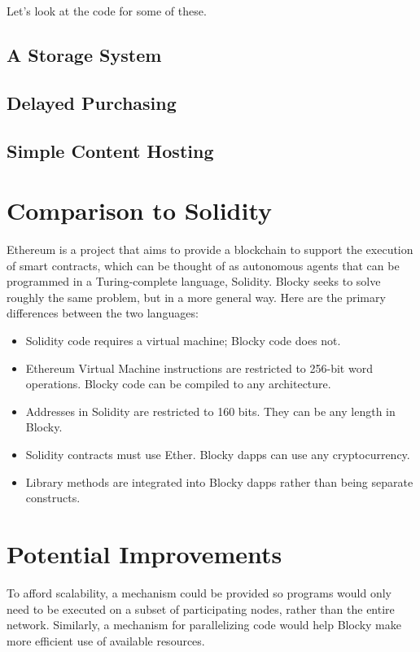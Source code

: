 \documentclass[letterpaper]{article}
\begin{document}
Let's look at the code for some of these.
\subsection{A Storage System}
\subsection{Delayed Purchasing}
\subsection{Simple Content Hosting}

\section{Comparison to Solidity}
Ethereum is a project that aims to provide a blockchain to support the execution of smart contracts, which can be thought of as autonomous agents that can be programmed in a Turing-complete language, Solidity. Blocky seeks to solve roughly the same problem, but in a more general way. Here are the primary differences between the two languages:
\begin{itemize}
  \item{Solidity code requires a virtual machine\cite{ethereum15}; Blocky code does not.}
  \item{Ethereum Virtual Machine instructions are restricted to 256-bit word operations\cite{ethereum15}. Blocky code can be compiled to any architecture.}
  \item{Addresses in Solidity are restricted to 160 bits\cite{ethereum15}. They can be any length in Blocky.}
  \item{Solidity contracts must use Ether\cite{ethereum15}. Blocky dapps can use any cryptocurrency.}
  \item{Library methods are integrated into Blocky dapps rather than being separate constructs.}
\end{itemize}

\section{Potential Improvements}
To afford scalability, a mechanism could be provided so programs would only need to be executed on a subset of participating nodes, rather than the entire network. Similarly, a mechanism for parallelizing code would help Blocky make more efficient use of available resources.
\end{document}

